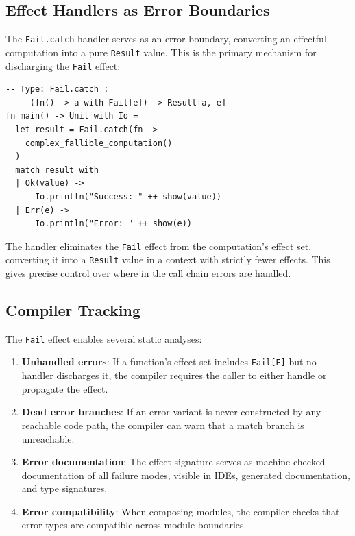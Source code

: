 \documentclass[11pt,twocolumn]{article}
\newcommand{\Fail}{\texttt{Fail}}
\newcommand{\Result}{\texttt{Result}}
\begin{document}
\subsection{Effect Handlers as Error Boundaries}

The \texttt{Fail.catch} handler serves as an error boundary, converting an effectful computation into a pure \Result{} value. This is the primary mechanism for discharging the \Fail{} effect:

\begin{lstlisting}
-- Type: Fail.catch :
--   (fn() -> a with Fail[e]) -> Result[a, e]
fn main() -> Unit with Io =
  let result = Fail.catch(fn ->
    complex_fallible_computation()
  )
  match result with
  | Ok(value) ->
      Io.println("Success: " ++ show(value))
  | Err(e) ->
      Io.println("Error: " ++ show(e))
\end{lstlisting}

The handler eliminates the \Fail{} effect from the computation's effect set, converting it into a \Result{} value in a context with strictly fewer effects. This gives precise control over where in the call chain errors are handled.

\subsection{Compiler Tracking}

The \Fail{} effect enables several static analyses:

\begin{enumerate}[leftmargin=*]
  \item \textbf{Unhandled errors}: If a function's effect set includes \texttt{Fail[E]} but no handler discharges it, the compiler requires the caller to either handle or propagate the effect.

  \item \textbf{Dead error branches}: If an error variant is never constructed by any reachable code path, the compiler can warn that a match branch is unreachable.

  \item \textbf{Error documentation}: The effect signature serves as machine-checked documentation of all failure modes, visible in IDEs, generated documentation, and type signatures.

  \item \textbf{Error compatibility}: When composing modules, the compiler checks that error types are compatible across module boundaries.
\end{enumerate}
\end{document}
